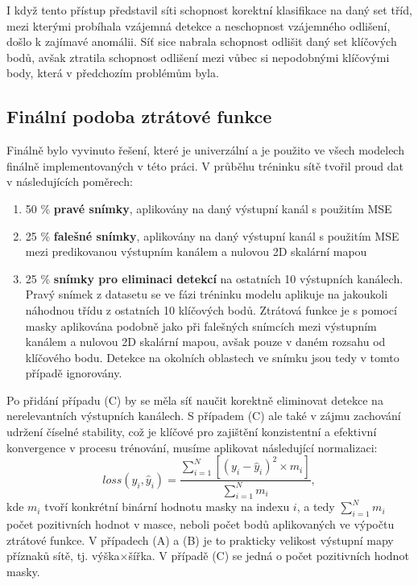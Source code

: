 I když tento přístup představil síti schopnost korektní klasifikace na daný set tříd, mezi kterými probíhala vzájemná detekce a neschopnost vzájemného odlišení, došlo k zajímavé anomálii. Síť sice nabrala schopnost odlišit daný set klíčových bodů, avšak ztratila schopnost odlišení mezi vůbec si nepodobnými klíčovými body, která v předchozím problémům byla.

\subsection{Finální podoba ztrátové funkce}
\label{subsec:Chapter473_final_loss}

Finálně bylo vyvinuto řešení, které je univerzální a je použito ve všech modelech finálně implementovaných v této práci. V průběhu tréninku sítě tvořil proud dat v následujících poměrech:
\begin{enumerate}[label=(\Alph*)]
    \item 50 \% \textbf{pravé snímky}, aplikovány na daný výstupní kanál s použitím MSE
    \item 25 \% \textbf{falešné snímky}, aplikovány na daný výstupní kanál s použitím MSE mezi predikovanou výstupním kanálem a nulovou 2D skalární mapou
    \item 25 \% \textbf{snímky pro eliminaci detekcí} na ostatních 10 výstupních kanálech. Pravý snímek z datasetu se ve fázi tréninku modelu aplikuje na jakoukoli náhodnou třídu z ostatních 10 klíčových bodů. Ztrátová funkce je s pomocí masky aplikována podobně jako při falešných snímcích mezi výstupním kanálem a nulovou 2D skalární mapou, avšak pouze v daném rozsahu od klíčového bodu. Detekce na okolních oblastech ve snímku jsou tedy v tomto případě ignorovány.
\end{enumerate}
Po přidání případu (C) by se měla síť naučit korektně eliminovat detekce na nerelevantních výstupních kanálech. S případem (C) ale také v zájmu zachování udržení číselné stability, což je klíčové pro zajištění konzistentní a efektivní konvergence v procesu trénování, musíme aplikovat následující normalizaci:
\begin{equation}
loss(y_i, \hat{y}_i) = \frac{\sum_{i=1}^{N} [(y_i - \hat{y}_i)^2\times m_i]}{\sum_{i=1}^{N} m_i},
\end{equation}
kde $m_i$ tvoří konkrétní binární hodnotu masky na indexu $i$, a tedy $\sum_{i=1}^{N} m_i$ počet pozitivních hodnot v masce, neboli počet bodů aplikovaných ve výpočtu ztrátové funkce. V případech (A) a (B) je to prakticky velikost výstupní mapy příznaků sítě, tj. výška$\times$šířka. V případě (C) se jedná o počet pozitivních hodnot masky.

